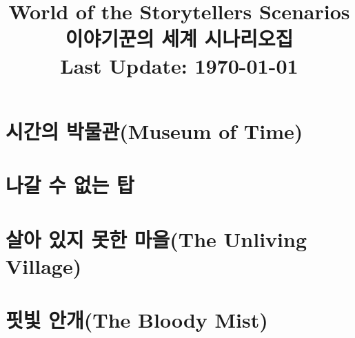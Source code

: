 \documentclass[11pt]{report}
\title{
	World of the Storytellers Scenarios\\
	이야기꾼의 세계 시나리오집\\
	\large Last Update: \today
	\ifDLC{\\ \textcolor{red}{DLC ENABLED}}\fi
}
\author{}
\date{}
\newif\ifpoison
\newif\ifrescue
\begin{document}
	\maketitle
	
	\setcounter{tocdepth}{-1}
	
\iffalse
	\chapter*{서론}
		
\fi
	
	\tableofcontents
	\part{시간의 박물관(Museum of Time)}
		
	\label{endof_MoT}
	
	\part{나갈 수 없는 탑}
		
	\label{endof_Tower}
	
	\part{살아 있지 못한 마을(The Unliving Village)}
		
	\label{endof_Unliving}
	
	\part{핏빛 안개(The Bloody Mist)}
		
	\label{endof_Bloody}
	
	\ifpoison
	\part{이 잔에 독을 탔다}
		
	\fi
	\label{endof_Poison}
	
	\ifrescue
	\part{이야기꾼의 세계 캠페인}
		
	\fi
	\label{endof_Rescue}
\end{document}
